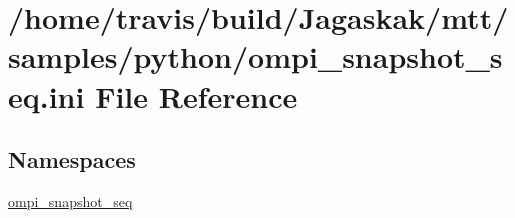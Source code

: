 \hypertarget{ompi__snapshot__seq_8ini}{\section{/home/travis/build/\-Jagaskak/mtt/samples/python/ompi\-\_\-snapshot\-\_\-seq.ini File Reference}
\label{ompi__snapshot__seq_8ini}
}
\subsection*{Namespaces}
\begin{DoxyCompactItemize}
\item 
\hyperlink{namespaceompi__snapshot__seq}{ompi\-\_\-snapshot\-\_\-seq}
\end{DoxyCompactItemize}
